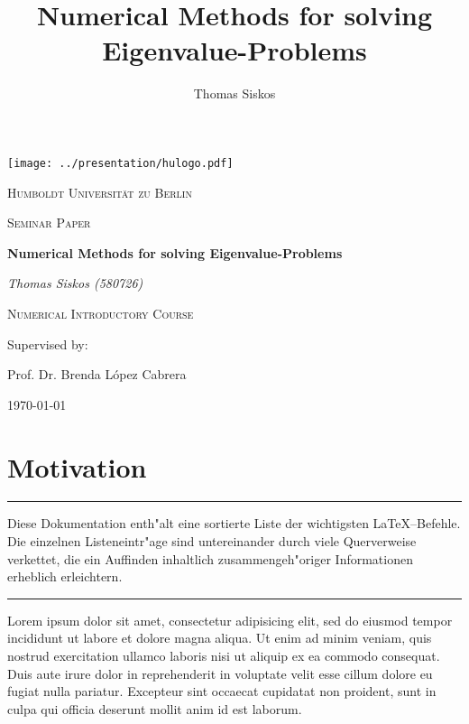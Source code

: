 \documentclass[12pt]{article}
\renewenvironment{abstract}{%

\begin{center}
\begin{minipage}{0.8\textwidth}
\rule{\textwidth}{1pt}}
{\par\noindent\rule{\textwidth}{1pt}
\end{minipage}
\end{center}}
\begin{document}
\title{Numerical Methods for solving Eigenvalue-Problems}
\author{Thomas Siskos}
\date{}

\begin{titlepage}
  \begin{center}

  \texttt{[image: ../presentation/hulogo.pdf]} \par
  {\scshape\LARGE Humboldt Universit{\"a}t zu Berlin \par}

  {\scshape\Large Seminar Paper\par}

  {\huge\bfseries Numerical Methods for solving Eigenvalue-Problems\par}

\vspace{1cm}

  {\Large\itshape Thomas Siskos (580726)\par}

  {\Large\scshape Numerical Introductory Course\par}

  \vfill
  Supervised by: \par
  {\Large Prof. Dr. Brenda L{\'o}pez Cabrera \par}
  \vfill
  {\large \today\par}
  \end{center}

\end{titlepage}

\tableofcontents
\listoftables
\listoffigures
\listofalgorithms
\newpage

\section{Motivation}

\begin{abstract}
  Diese Dokumentation enth"alt eine sortierte Liste der wichtigsten
  \LaTeX--Befehle. Die einzelnen Listeneintr"age sind untereinander
  durch viele Querverweise verkettet, die ein Auffinden inhaltlich
  zusammengeh"origer Informationen erheblich erleichtern.
\end{abstract}
\vspace{3mm}


Lorem ipsum dolor sit amet, consectetur adipisicing elit, sed do eiusmod tempor incididunt ut labore et dolore magna aliqua. Ut enim ad minim veniam, quis nostrud exercitation ullamco laboris nisi ut aliquip ex ea commodo consequat. Duis aute irure dolor in reprehenderit in voluptate velit esse cillum dolore eu fugiat nulla pariatur. Excepteur sint occaecat cupidatat non proident, sunt in culpa qui officia deserunt mollit anim id est laborum.
\end{document}
